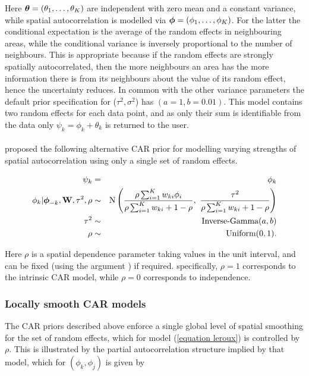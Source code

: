 \documentclass[article,shortnames,nojss]{jss}
\newcommand{\bd}[1]{\ensuremath{\mbox{\boldmath $#1$}}}
\begin{document}
Here $\bd{\theta}=(\theta_{1},\ldots,\theta_{K})$ are independent with zero mean and a constant variance, while spatial autocorrelation is modelled via $\bd{\phi}=(\phi_{1},\ldots,\phi_{K})$. For the latter the conditional expectation is the average of the random effects in neighbouring areas, while the conditional variance is inversely proportional to the number of neighbours. This is appropriate because if the random effects are strongly spatially autocorrelated, then the more neighbours an area has the more information there is from its neighbours about the value of its random effect, hence the uncertainty reduces. In common with the other variance parameters the default prior specification for ($\tau^{2},\sigma^2$) has $(a=1, b=0.01)$. This model contains two random effects for each data point, and as only their sum is identifiable from the data only $\psi_k=\phi_k+\theta_k$ is returned to the user.\\

\\
\cite{leroux2000} proposed the following alternative CAR prior for modelling varying strengths of spatial autocorrelation using only a single set of random effects.

\begin{eqnarray}
\psi_k&=&\phi_k\label{equation leroux}\\
\phi_{k}| \bd{\phi}_{-k},\mathbf{W},\tau^2, \rho&\sim&\mbox{N}\left(\frac{\rho\sum_{i=1}^{K}w_{ki}\phi_{i}}{\rho\sum_{i=1}^{K}w_{ki} + 1-\rho},~
\frac{\tau^{2}}{\rho\sum_{i=1}^{K}w_{ki} + 1-\rho}\right)\nonumber\\
\tau^{2}&\sim&\mbox{Inverse-Gamma}(a, b)\nonumber\\
\rho&\sim&\mbox{Uniform}(0,1).\nonumber
\end{eqnarray}

Here $\rho$ is a spatial dependence parameter taking values in the unit interval, and can be fixed (using the argument ) if required. specifically, $\rho=1$ corresponds to  the intrinsic CAR model, while $\rho=0$ corresponds to independence.


\subsubsection{Locally smooth CAR models}
The CAR priors described above enforce a single global level of spatial smoothing for the set of random effects, which for model (\ref{equation leroux}) is controlled by $\rho$. This is illustrated by the partial autocorrelation structure implied by that model, which for $(\phi_k, \phi_j)$ is given by
\end{document}
